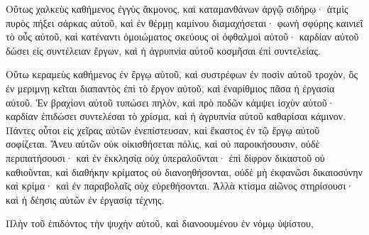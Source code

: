 {\par }{\PP {}Οὕτως χαλκεὺς καθήμενος ἐγγὺς ἄκμονος, καὶ καταμανθάνων ἀργῷ σιδήρῳ· ἀτμὶς πυρὸς πήξει σάρκας αὐτοῦ, καὶ ἐν θέρμῃ καμίνου διαμαχήσεται· φωνὴ σφύρης καινιεῖ τὸ οὖς αὐτοῦ, καὶ κατέναντι ὁμοιώματος σκεύους οἱ ὀφθαλμοὶ αὐτοῦ· καρδίαν αὐτοῦ δώσει εἰς συντέλειαν ἔργων, καὶ ἡ ἀγρυπνία αὐτοῦ κοσμῆσαι ἐπὶ συντελείας.
\par }{\PP {}Οὕτω κεραμεὺς καθήμενος ἐν ἔργῳ αὐτοῦ, καὶ συστρέφων ἐν ποσὶν αὐτοῦ τροχὸν, ὃς ἐν μεριμνῃ κεῖται διαπαντὸς ἐπὶ τὸ ἔργον αὐτοῦ, καὶ ἐναρίθμιος πᾶσα ἡ ἐργασία αὐτοῦ.
Ἐν βραχίονι αὐτοῦ τυπώσει πηλὸν, καὶ πρὸ ποδῶν κάμψει ἰσχὺν αὐτοῦ· καρδίαν ἐπιδώσει συντελέσαι τὸ χρίσμα, καὶ ἡ ἀγρυπνία αὐτοῦ καθαρίσαι κάμινον.
Πάντες οὗτοι εἰς χεῖρας αὐτῶν ἐνεπίστευσαν, καὶ ἕκαστος ἐν τῷ ἔργῳ αὐτοῦ σοφίζεται.
Ἄνευ αὐτῶν οὐκ οἰκισθήσεται πόλις, καὶ οὐ παροικήσουσιν, οὐδὲ περιπατήσουσι·
καὶ ἐν ἐκκλησίᾳ οὐχ ὑπεραλοῦνται· ἐπὶ δίφρον δικαστοῦ οὐ καθιοῦνται, καὶ διαθήκην κρίματος οὐ διανοηθήσονται, οὐδὲ μὴ ἐκφανῶσι δικαιοσύνην καὶ κρίμα· καὶ ἐν παραβολαῖς οὐχ εὑρεθήσονται.
Ἀλλὰ κτίσμα αἰῶνος στηρίσουσι· καὶ ἡ δέησις αὐτῶν ἐν ἐργασίᾳ τέχνης.
\par }{\PP Πλὴν τοῦ ἐπιδόντος τὴν ψυχὴν αὐτοῦ, καὶ διανοουμένου ἐν νόμῳ ὑψίστου,

}
